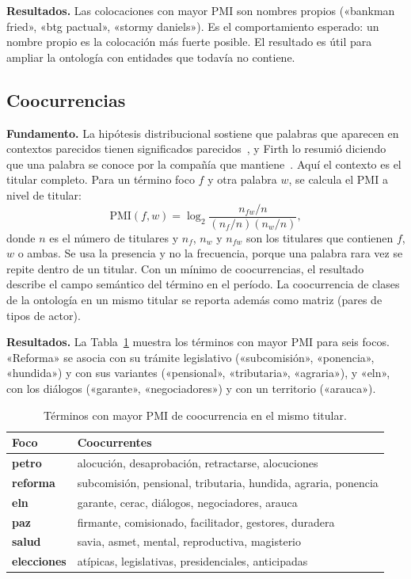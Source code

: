 \documentclass[10pt,twocolumn]{article}
\begin{document}
\textbf{Resultados.} Las colocaciones con mayor PMI son nombres propios
(«bankman fried», «btg pactual», «stormy daniels»). Es el comportamiento
esperado: un nombre propio es la colocación más fuerte posible. El resultado es
útil para ampliar la ontología con entidades que todavía no contiene.

\subsection{Coocurrencias}

\textbf{Fundamento.} La hipótesis distribucional sostiene que palabras que
aparecen en contextos parecidos tienen significados
parecidos~\cite{harris1954}, y Firth lo resumió diciendo que una palabra se
conoce por la compañía que mantiene~\cite{firth1957}. Aquí el contexto es el
titular completo. Para un término foco $f$ y otra palabra $w$, se calcula el
PMI a nivel de titular:
\begin{equation}
\mathrm{PMI}(f,w)=\log_2\frac{n_{fw}/n}{(n_f/n)(n_w/n)},
\end{equation}
donde $n$ es el número de titulares y $n_f$, $n_w$ y $n_{fw}$ son los
titulares que contienen $f$, $w$ o ambas. Se usa la presencia y no la
frecuencia, porque una palabra rara vez se repite dentro de un titular. Con un
mínimo de coocurrencias, el resultado describe el campo semántico del término
en el período. La coocurrencia de clases de la ontología en un mismo titular
se reporta además como matriz (pares de tipos de actor).

\textbf{Resultados.} La Tabla~\ref{tab:cooc} muestra los términos con mayor
PMI para seis focos. «Reforma» se asocia con su
trámite legislativo («subcomisión», «ponencia», «hundida») y con sus variantes
(«pensional», «tributaria», «agraria»), y «eln», con los diálogos («garante»,
«negociadores») y con un territorio («arauca»).

\begin{table}[t]
\centering\small
\caption{Términos con mayor PMI de coocurrencia en el mismo titular.}
\label{tab:cooc}
\begin{tabular}{>{\bfseries}l p{5.1cm}}
\toprule
\textnormal{\textbf{Foco}} & \textbf{Coocurrentes}\\
\midrule
petro & alocución, desaprobación, retractarse, alocuciones\\
reforma & subcomisión, pensional, tributaria, hundida, agraria, ponencia\\
eln & garante, cerac, diálogos, negociadores, arauca\\
paz & firmante, comisionado, facilitador, gestores, duradera\\
salud & savia, asmet, mental, reproductiva, magisterio\\
elecciones & atípicas, legislativas, presidenciales, anticipadas\\
\bottomrule
\end{tabular}
\end{table}
\end{document}
